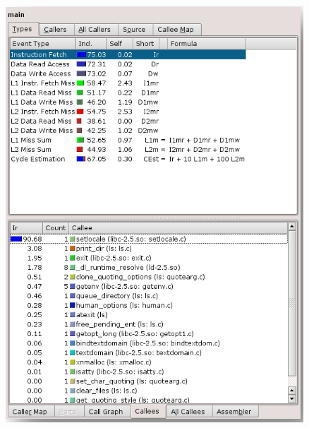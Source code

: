\medskip
\begin{figure}[ht]
    \centering
    \begin{minipage}{0.5\textwidth}
        \centering
        \includegraphics[width=\textwidth]{figures/kcachegrind_caller_callee.png}
    \end{minipage}\hfill
    \begin{minipage}{0.5\textwidth}
        \centering

\end{minipage}
\end{figure}
